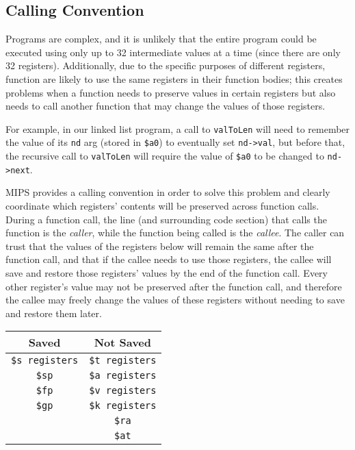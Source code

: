 \documentclass{article}
\begin{document}
\subsection{Calling Convention}
Programs are complex, and it is unlikely that the entire program could be executed using only up to 32 intermediate values at a time (since there are only 32 registers). Additionally, due to the specific purposes of different registers, function are likely to use the same registers in their function bodies; this creates problems when a function needs to preserve values in certain registers but also needs to call another function that may change the values of those registers. 

For example, in our linked list program, a call to \texttt{valToLen} will need to remember the value of its \texttt{nd} arg (stored in \texttt{\$a0}) to eventually set \texttt{nd->val}, but before that, the recursive call to \texttt{valToLen} will require the value of \texttt{\$a0} to be changed to \texttt{nd->next}.

MIPS provides a calling convention in order to solve this problem and clearly coordinate which registers' contents will be preserved across function calls. During a function call, the line (and surrounding code section) that calls the function is the \textit{caller}, while the function being called is the \textit{callee}. The caller can trust that the values of the registers below will remain the same after the function call, and that if the callee needs to use those registers, the callee will save and restore those registers' values by the end of the function call. Every other register's value may not be preserved after the function call, and therefore the callee may freely change the values of these registers without needing to save and restore them later.
\begin{center}
 \begin{tabular}{||c c||} 
 \hline
 \textbf{Saved} & \textbf{Not Saved}\\
 \hline
 \texttt{\$s registers} & \texttt{\$t registers}\\ 
 \texttt{\$sp} & \texttt{\$a registers} \\
 \texttt{\$fp} & \texttt{\$v registers}\\ 
 \texttt{\$gp} & \texttt{\$k registers}\\ 
 \texttt{\ } & \texttt{\$ra}\\ 
 \texttt{\ } & \texttt{\$at}\\ 
 \hline
\end{tabular}
\end{center}
\end{document}
